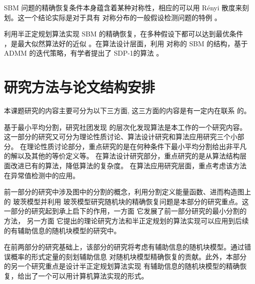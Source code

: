 SBM 问题的精确恢复条件本身蕴含着某种对称性，相应的可以用 Rényi 散度来刻划。这一个结论实际是对于具有
对称分布的一般假设检测问题的特例 \cite{gao2018community}。

利用半正定规划算法实现 SBM 的精确恢复，在多种假设下都可以达到最优条件 \cite{hajek2016achieving}，是最大似然算法好的近似 。在算法设计层面，利用 对称的 SBM 的结构，基于 ADMM 的迭代策略，有学者提出了 SDP-1的算法 \cite{amini2018semidefinite}。

\section{研究方法与论文结构安排}
本课题研究的内容主要可分为以下三方面, 这三方面的内容是有一定内在联系
的。

基于最小平均分割，研究社团发现
的层次化发现算法是本工作的一个研究内容。这一部分的研究又可分为理论性质讨论、算法设计研究和算法应用研究三个小部分。
在理论性质讨论部分，重点研究的是在何种条件下最小平均分割给出非平凡的解以及其他的等价定义等。
在算法设计研究部分，重点研究的是从算法结构层面改进已有的算法，降低算法的复杂度。
在算法应用研究层面，重点考虑该方法在异常值检测中的应用。
 
前一部分的研究中涉及图中的分割的概念，利用分割定义能量函数、进而构造图上的 玻茨模型并利用
玻茨模型研究随机块的精确恢复问题是本部分的研究重点。这一部分的研究起到承上启下的作用，一方面
它发展了前一部分研究的最小分割的方法，
另一方面
它提出的理论研究方法和半正定规划的算法实现可以应用到后续的有辅助信息的随机块模型的研究中。

在前两部分的研究基础上，该部分的研究将考虑有辅助信息的随机块模型。通过错误概率的形式定量的刻划辅助信息
对随机块模型精确恢复的贡献。此外，本部分的另一个研究重点是设计半正定规划算法实现
有辅助信息的随机块模型的精确恢复，给出了一个可以用计算机算法实现的形式。
